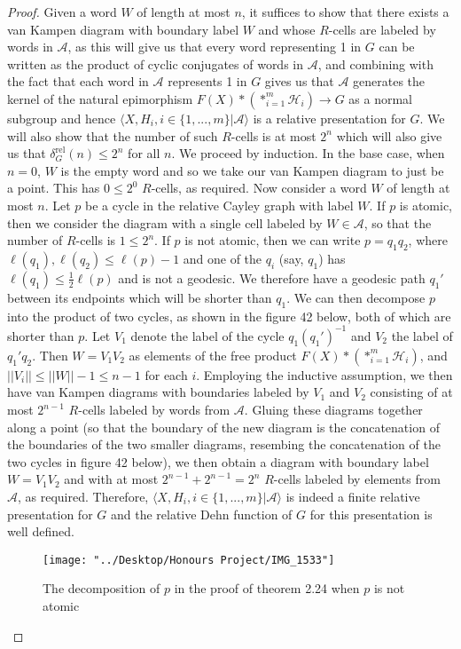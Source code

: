 \documentclass[12pt]{article}
\begin{document}
	\begin{proof}
		
		Given a word $W$ of length at most $n$, it suffices to show that there exists a van Kampen diagram with boundary label $W$ and whose $R$-cells are labeled by words in $\mathcal{A}$, as this will give us that every word representing 1 in $G$ can be written as the product of cyclic conjugates of words in $\mathcal{A}$, and combining with the fact that each word in $\mathcal{A}$ represents 1 in $G$ gives us that $\mathcal{A}$ generates the kernel of the natural epimorphism $F(X) * (*_{i=1}^m \mathcal{H}_i) \rightarrow G$ as a normal subgroup and hence $\langle X, H_i, i \in \{1,...,m\} \vert \mathcal{A} \rangle$ is a relative presentation for $G$. We will also show that the number of such $R$-cells is at most $2^n$ which will also give us that $\delta_G^{\text{rel}}(n) \leq 2^n$ for all $n$. We proceed by induction. In the base case, when $n = 0$, $W$ is the empty word and so we take our van Kampen diagram to just be a point. This has $0 \leq 2^0$ $R$-cells, as required. Now consider a word $W$ of length at most $n$. Let $p$ be a cycle in the relative Cayley graph with label $W$. If $p$ is atomic, then we consider the diagram with a single cell labeled by $W \in \mathcal{A}$, so that the number of $R$-cells is $1 \leq 2^n$. If $p$ is not atomic, then we can write $p = q_1 q_2$, where $\ell(q_1), \ell(q_2) \leq \ell(p) - 1$ and one of the $q_i$ (say, $q_1$) has $\ell(q_1) \leq \frac{1}{2} \ell(p)$ and is not a geodesic. We therefore have a geodesic path $q_1'$ between its endpoints which will be shorter than $q_1$. We can then decompose $p$ into the product of two cycles, as shown in the figure 42 below, both of which are shorter than $p$. Let $V_1$ denote the label of the cycle $q_1 (q_1')^{-1}$ and $V_2$ the label of $q_1' q_2$. Then $W = V_1 V_2$ as elements of the free product $F(X) * (*_{i = 1}^m \mathcal{H}_i)$, and $\vert \vert V_i \vert \vert \leq \vert \vert W \vert \vert - 1 \leq n - 1$ for each $i$. Employing the inductive assumption, we then have van Kampen diagrams with boundaries labeled by $V_1$ and $V_2$ consisting of at most $2^{n-1}$ $R$-cells labeled by words from $\mathcal{A}$. Gluing these diagrams together along a point (so that the boundary of the new diagram is the concatenation of the boundaries of the two smaller diagrams, resembing the concatenation of the two cycles in figure 42 below), we then obtain a diagram with boundary label $W = V_1 V_2$ and with at most $2^{n-1} + 2^{n-1} = 2^n$ $R$-cells labeled by elements from $\mathcal{A}$, as required. Therefore, $\langle X, H_i, i \in \{1,...,m\} \vert \mathcal{A} \rangle$ is indeed a finite relative presentation for $G$ and the relative Dehn function of $G$ for this presentation is well defined.
		
\begin{figure} [H]
	\centering
	\texttt{[image: "../Desktop/Honours Project/IMG\_1533"]}
	\caption{The decomposition of $p$ in the proof of theorem 2.24 when $p$ is not atomic}
	\label{fig:img1533}
\end{figure}
		
	\end{proof}
	
\end{document}
